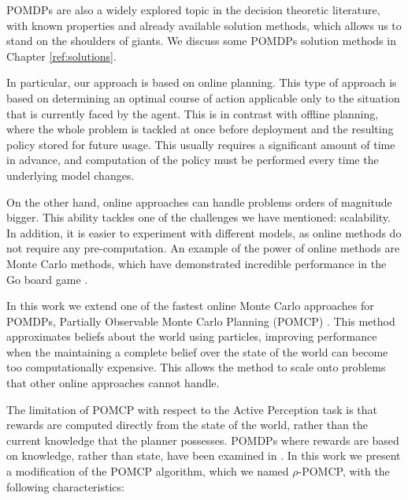 POMDPs are also  a widely explored topic in the decision theoretic literature, with known properties
and already available solution methods, which allows us to stand on the shoulders of giants. We
discuss some POMDPs solution methods in Chapter \ref{ref:solutions}.


In particular, our approach is based on online planning. This type of approach is based on
determining an optimal course of action applicable only to the situation that is currently faced by
the agent. This is in contrast with offline planning, where the whole problem is tackled at once
before deployment and the resulting policy stored for future usage. This usually requires a
significant amount of time in advance, and computation of the policy must be performed every time
the underlying model changes.

On the other hand, online approaches can handle problems orders of magnitude bigger. This ability
tackles one of the challenges we have mentioned: scalability. In addition, it is easier to
experiment with different models, as online methods do not require any pre-computation. An example
of the power of online methods are Monte Carlo methods, which have demonstrated incredible
performance in the Go board game \cite{cit:mcts}.


In this work we extend one of the fastest online Monte Carlo approaches for POMDPs, Partially
Observable Monte Carlo Planning (POMCP) \cite{cit:pomcp}. This method approximates beliefs about the
world using particles, improving performance when the maintaining a complete belief over the state
of the world can become too computationally expensive. This allows the method to scale onto problems
that other online approaches cannot handle.

The limitation of POMCP with respect to the Active Perception task is that rewards are computed
directly from the state of the world, rather than the current knowledge that the planner possesses.
POMDPs where rewards are based on knowledge, rather than state, have been examined in
\cite{cit:rpomdp}. In this work we present a modification of the POMCP algorithm, which we named
$\rho$-POMCP, with the following characteristics: 

